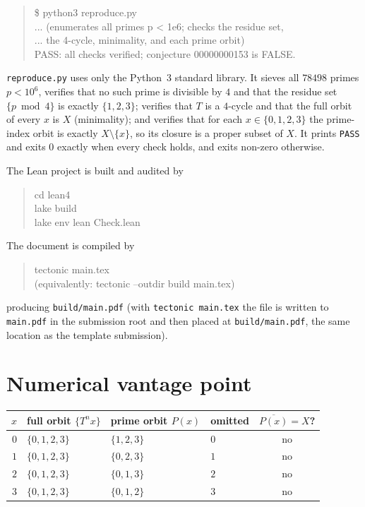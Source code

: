 \documentclass[11pt]{article}
\theoremstyle{definition}
\theoremstyle{remark}
\begin{document}
\begin{quote}\ttfamily
\$ python3 reproduce.py\\
... (enumerates all primes p < 1e6; checks the residue set,\\
... the 4-cycle, minimality, and each prime orbit)\\
PASS: all checks verified; conjecture 00000000153 is FALSE.
\end{quote}

\texttt{reproduce.py} uses only the Python~3 standard library. It sieves all
$78498$ primes $p < 10^6$, verifies that no such prime is divisible by $4$ and
that the residue set $\{p \bmod 4\}$ is exactly $\{1,2,3\}$; verifies that $T$
is a $4$-cycle and that the full orbit of every $x$ is $X$ (minimality); and
verifies that for each $x \in \{0,1,2,3\}$ the prime-index orbit is exactly
$X \setminus \{x\}$, so its closure is a proper subset of $X$. It prints
\texttt{PASS} and exits $0$ exactly when every check holds, and exits non-zero
otherwise.

The Lean project is built and audited by

\begin{quote}\ttfamily
cd lean4\\
lake build\\
lake env lean Check.lean
\end{quote}

The document is compiled by

\begin{quote}\ttfamily
tectonic main.tex\\
(equivalently: tectonic --outdir build main.tex)
\end{quote}

\noindent producing \texttt{build/main.pdf} (with \texttt{tectonic main.tex}
the file is written to \texttt{main.pdf} in the submission root and then placed
at \texttt{build/main.pdf}, the same location as the template submission).

\section{Numerical vantage point}

\begin{center}
\begin{tabular}{r l l l c}
\toprule
$x$ & full orbit $\{T^n x\}$ & prime orbit $P(x)$ & omitted & $\overline{P(x)} = X$? \\
\midrule
$0$ & $\{0,1,2,3\}$ & $\{1,2,3\}$     & $0$ & no \\
$1$ & $\{0,1,2,3\}$ & $\{0,2,3\}$     & $1$ & no \\
$2$ & $\{0,1,2,3\}$ & $\{0,1,3\}$     & $2$ & no \\
$3$ & $\{0,1,2,3\}$ & $\{0,1,2\}$     & $3$ & no \\
\bottomrule
\end{tabular}
\end{center}
\end{document}
